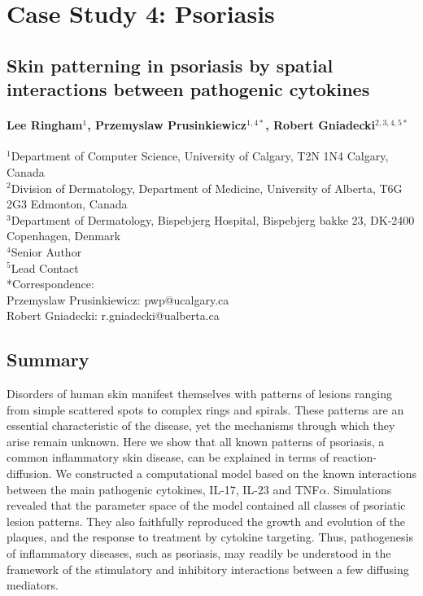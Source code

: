 \chapter{Case Study 4: Psoriasis}
\section*{Skin patterning in psoriasis by spatial interactions between pathogenic cytokines}
\subsubsection*{Lee Ringham$^1$, Przemyslaw Prusinkiewicz$^{1,4*}$, Robert Gniadecki$^{2,3,4,5*}$}

$^1$Department of Computer Science, University of Calgary, T2N 1N4 Calgary, Canada\\
$^2$Division of Dermatology, Department of Medicine, University of Alberta, T6G 2G3 Edmonton, Canada\\
$^3$Department of Dermatology, Bispebjerg Hospital, Bispebjerg bakke 23, DK-2400 Copenhagen, Denmark\\
$^4$Senior Author\\
$^5$Lead Contact\\
*Correspondence:\\
Przemyslaw Prusinkiewicz: pwp@ucalgary.ca\\
Robert Gniadecki: r.gniadecki@ualberta.ca\\

\section{Summary} 
Disorders of human skin manifest themselves with patterns of lesions ranging from simple scattered spots to complex rings and spirals. These patterns are an essential characteristic of the disease, yet the mechanisms through which they arise remain unknown. Here we show that all known patterns of psoriasis, a common inflammatory skin disease, can be explained in terms of reaction-diffusion. We constructed a computational model based on the known interactions between the main pathogenic cytokines, IL-17, IL-23 and TNF$\alpha$. Simulations revealed that the parameter space of the model contained all classes of psoriatic lesion patterns. They also faithfully reproduced the growth and evolution of the plaques, and the response to treatment by cytokine targeting. Thus, pathogenesis of inflammatory diseases, such as psoriasis, may readily be understood in the framework of the stimulatory and inhibitory interactions between a few diffusing mediators.

